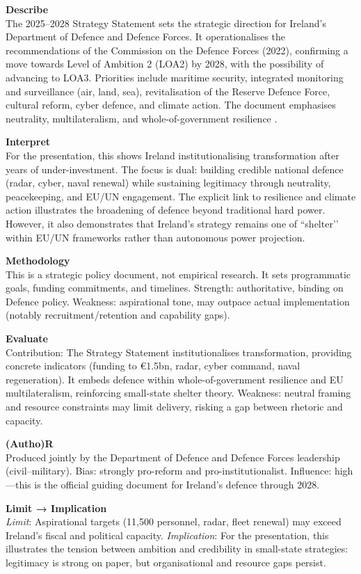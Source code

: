 \textbf{Describe} \\
The 2025--2028 Strategy Statement sets the strategic direction for Ireland’s Department of Defence and Defence Forces. It operationalises the recommendations of the Commission on the Defence Forces (2022), confirming a move towards Level of Ambition 2 (LOA2) by 2028, with the possibility of advancing to LOA3. Priorities include maritime security, integrated monitoring and surveillance (air, land, sea), revitalisation of the Reserve Defence Force, cultural reform, cyber defence, and climate action. The document emphasises neutrality, multilateralism, and whole-of-government resilience \parencite{DOD_2025}.

\textbf{Interpret} \\
For the presentation, this shows Ireland institutionalising transformation after years of under-investment. The focus is dual: building credible national defence (radar, cyber, naval renewal) while sustaining legitimacy through neutrality, peacekeeping, and EU/UN engagement. The explicit link to resilience and climate action illustrates the broadening of defence beyond traditional hard power. However, it also demonstrates that Ireland’s strategy remains one of ``shelter’’ within EU/UN frameworks rather than autonomous power projection.

\textbf{Methodology} \\
This is a strategic policy document, not empirical research. It sets programmatic goals, funding commitments, and timelines. Strength: authoritative, binding on Defence policy. Weakness: aspirational tone, may outpace actual implementation (notably recruitment/retention and capability gaps).

\textbf{Evaluate} \\
Contribution: The Strategy Statement institutionalises transformation, providing concrete indicators (funding to €1.5bn, radar, cyber command, naval regeneration). It embeds defence within whole-of-government resilience and EU multilateralism, reinforcing small-state shelter theory. Weakness: neutral framing and resource constraints may limit delivery, risking a gap between rhetoric and capacity.

\textbf{(Autho)R} \\
Produced jointly by the Department of Defence and Defence Forces leadership (civil–military). Bias: strongly pro-reform and pro-institutionalist. Influence: high—this is the official guiding document for Ireland’s defence through 2028.

\textbf{Limit → Implication} \\
\textit{Limit}: Aspirational targets (11,500 personnel, radar, fleet renewal) may exceed Ireland’s fiscal and political capacity.  
\textit{Implication}: For the presentation, this illustrates the tension between ambition and credibility in small-state strategies: legitimacy is strong on paper, but organisational and resource gaps persist.

